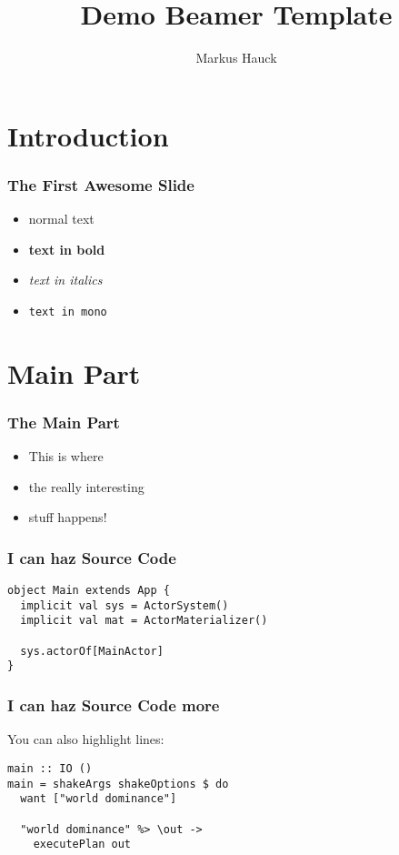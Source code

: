 \documentclass{beamer}
\title{Demo Beamer Template}
\author{Markus Hauck}
\begin{document}
\begin{frame}
  \titlepage
\end{frame}

\section{Introduction}
\label{sec:introduction}
 
\begin{frame}
\frametitle{The First Awesome Slide}
\begin{itemize}
\item normal text
\item \textbf{text in bold}
\item \textit{text in italics}
\item \texttt{text in mono}
\end{itemize}
\end{frame}

\section{Main Part}
\label{sec:main-part}
\begin{frame}
  \frametitle{The Main Part}
  \begin{itemize}
  \item This is where
  \item the really interesting
  \item stuff happens!
  \end{itemize}
\end{frame}

\begin{frame}[fragile]
  \frametitle{I can haz Source Code}
  \begin{center}
\begin{verbatim}
object Main extends App {
  implicit val sys = ActorSystem()
  implicit val mat = ActorMaterializer()
  
  sys.actorOf[MainActor]
}
\end{verbatim}
  \end{center}
\end{frame}

\begin{frame}[fragile]
  \frametitle{I can haz Source Code more}
  You can also highlight lines:
  \begin{center}
\begin{verbatim}
main :: IO ()
main = shakeArgs shakeOptions $ do
  want ["world dominance"]

  "world dominance" %> \out ->
    executePlan out
\end{verbatim}
  \end{center}
\end{frame}
\end{document}
